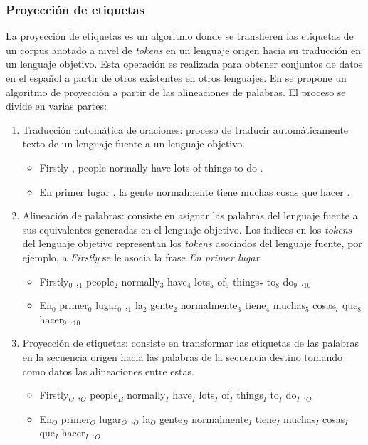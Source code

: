 \documentclass{rcci} %
\begin{document}
\subsubsection*{Proyecci\'on de etiquetas} %

La proyecci\'on de etiquetas es un algoritmo donde se 
transfieren las etiquetas de un corpus anotado a nivel de \textit{tokens} en un lenguaje origen hacia su traducci\'on en un
lenguaje objetivo. Esta operaci\'on es realizada para obtener conjuntos de datos en el espa\~nol a partir de otros 
existentes en otros lenguajes. En \citep{eger2018cross} se propone un algoritmo de proyecci\'on a partir de las alineaciones de 
palabras. El proceso se divide en varias partes:

\begin{enumerate}
	\item Traducci\'on autom\'atica de oraciones: proceso de
	traducir autom\'aticamente texto de un lenguaje fuente a un lenguaje objetivo.
	\begin{itemize}
		\item Firstly , people normally have lots of things to do . 
		\item En primer lugar , la gente normalmente tiene muchas cosas que hacer .
	\end{itemize}
	\item Alineaci\'on de palabras: consiste en asignar las palabras del lenguaje fuente
	a sus equivalentes generadas en el lenguaje objetivo. Los \'indices en los \emph{tokens} del lenguaje objetivo representan 
	los \emph{tokens} asociados del lenguaje fuente, por ejemplo, a \emph{Firstly} se le asocia la frase \emph{En primer lugar}.
	\begin{itemize}
		\item Firstly$_0$ ,$_1$ people$_2$ normally$_3$ have$_4$ lots$_5$ of$_6$ things$_7$ to$_8$ do$_9$ .$_{10}$ \\
		\item En$_0$ primer$_0$ lugar$_0$ ,$_1$ la$_2$ gente$_2$ normalmente$_3$ tiene$_4$ muchas$_5$ cosas$_7$ que$_8$ hacer$_9$ .$_{10}$
	\end{itemize}
	\item Proyecci\'on de etiquetas: consiste en transformar las etiquetas de las palabras en la secuencia origen
	hacia las palabras de la secuencia destino tomando como datos las alineaciones entre estas.
	\begin{itemize}
		\item Firstly$_O$ ,$_O$ people$_B$ normally$_I$ have$_I$ lots$_I$ of$_I$ things$_I$ to$_I$ do$_I$ .$_O$ \\
		\item En$_O$ primer$_O$ lugar$_O$ ,$_O$ la$_O$ gente$_B$ normalmente$_I$ tiene$_I$ muchas$_I$ cosas$_I$ que$_I$ hacer$_I$ .$_O$
	\end{itemize}
\end{enumerate}
\end{document}
